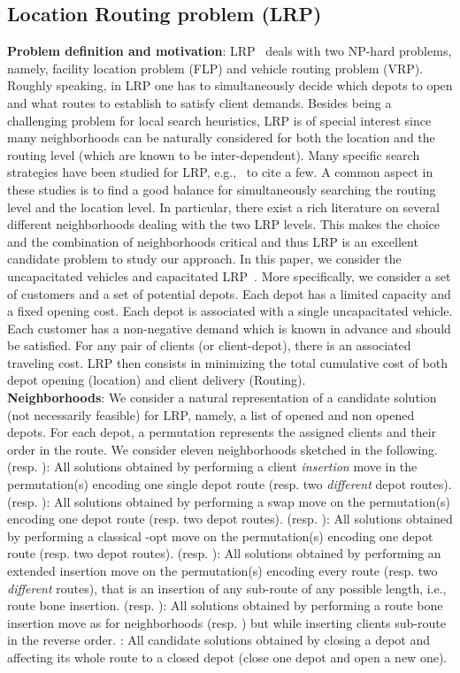 \documentclass{acm_proc_article-sp}
\begin{document}
\subsection{Location Routing problem (LRP)}
\textbf{Problem definition and motivation}: LRP~\cite{lrp,Min} deals with two NP-hard problems, namely, facility location problem (FLP) and vehicle routing problem (VRP). Roughly speaking, in LRP one has to simultaneously decide which depots to open and what routes to establish to satisfy client demands. 
Besides being a challenging problem for local search heuristics, LRP is of special interest since many neighborhoods can be naturally considered for both the location and the routing level (which are known to be inter-dependent). Many specific search strategies have been studied for LRP, e.g.,~\cite{galrp,lrpvns,duhamel} to cite a few. A common aspect in these studies is to find a good balance for simultaneously searching the routing level and the location level. In particular, there exist a rich literature on several different neighborhoods dealing with the two LRP levels. This makes the choice and the combination of neighborhoods critical and thus LRP is an excellent candidate problem to study our approach. In this paper, we consider the uncapacitated vehicles and capacitated LRP~\cite{ulrp}. More specifically, we consider a set of  customers and a set of  potential depots. Each depot has a limited capacity and a fixed opening cost. Each depot is associated with a single uncapacitated vehicle. Each customer has a non-negative demand which is known in advance and should be satisfied. For any pair of clients (or client-depot), there is an associated traveling cost. LRP then consists in minimizing the total cumulative cost of both depot opening (location) and client delivery (Routing).\\
\textbf{Neighborhoods}: We consider a natural representation of a candidate solution (not necessarily feasible) for LRP, namely, a list of opened and non opened depots. For each depot, a permutation represents the assigned clients and their order in the route. We consider eleven neighborhoods sketched in the following.  (resp. ): All solutions obtained by performing a client \emph{insertion} move in the permutation(s) encoding one single depot route (resp. two \emph{different} depot routes).  (resp. ): All solutions obtained by performing a swap move on the permutation(s) encoding one depot route (resp. two depot routes).  (resp. ): All solutions obtained by performing a classical -opt move on the permutation(s) encoding one depot route (resp. two depot routes).  (resp. ): All solutions obtained by performing an extended insertion move on the permutation(s) encoding every route (resp. two \emph{different} routes), that is an insertion of any sub-route of any possible length, i.e., route bone insertion.  (resp. ): All solutions obtained by performing a route bone insertion move as for neighborhoods  (resp. ) but while inserting clients sub-route in the reverse order. : All candidate solutions obtained by closing a depot and affecting its whole route to a closed depot (close one depot and open a new one).\\
\end{document}
